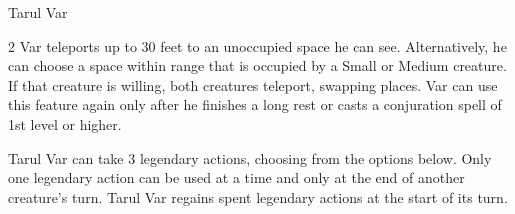 \documentclass[10pt,a4paper,twoside,bg=print,twocolumn,openany,nodeprecatedcode]{dndbook}
\begin{document}
\begin{DndMonster}[float*=b,width=\textwidth + 8pt]{Tarul Var}
\begin{multicols}{2}
Var teleports up to 30 feet to an unoccupied space he can see. Alternatively, he can choose a space within range that is occupied by a Small or Medium creature. If that creature is willing, both creatures teleport, swapping places. Var can use this feature again only after he finishes a long rest or casts a conjuration spell of 1st level or higher.

Tarul Var can take 3 legendary actions, choosing from the options below. Only one legendary action can be used at a time and only at the end of another creature's turn. Tarul Var regains spent legendary actions at the start of its turn.

\begin{DndMonsterLegendaryActions}
\end{DndMonsterLegendaryActions}
\end{multicols}
\end{DndMonster}
\end{document}
